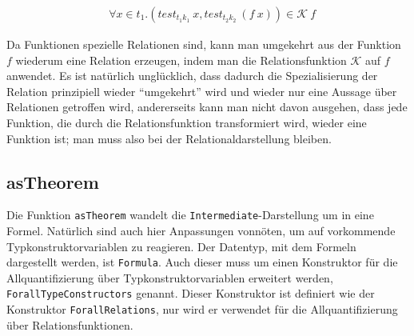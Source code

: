 \begin{align*}
& \forall x \in t_1 . (test_{t_1 k_1}\ x, test_{t_2 k_2}\ (f\ x)) \in \mathcal{K}\ f
\end{align*}

Da Funktionen spezielle Relationen sind, kann man umgekehrt aus der Funktion $f$ wiederum eine Relation erzeugen, indem
man die Relationsfunktion $\mathcal{K}$ auf $f$ anwendet. Es ist natürlich unglücklich, dass dadurch die Spezialisierung
der Relation prinzipiell wieder ``umgekehrt'' wird und wieder nur eine Aussage über Relationen getroffen wird, andererseits
kann man nicht davon ausgehen, dass jede Funktion, die durch die Relationsfunktion transformiert wird, wieder eine Funktion ist;
man muss also bei der Relationaldarstellung bleiben.





\subsection{asTheorem}

Die Funktion \texttt{asTheorem} wandelt die \texttt{Intermediate}-Darstellung um in eine Formel. Natürlich sind auch hier
Anpassungen vonnöten, um auf vorkommende Typkonstruktorvariablen zu reagieren. Der Datentyp, mit dem Formeln
dargestellt werden, ist \texttt{Formula}. Auch dieser muss um einen Konstruktor für die Allquantifizierung über
Typkonstruktorvariablen erweitert werden, \texttt{ForallTypeConstructors} genannt.
Dieser Konstruktor ist definiert wie der Konstruktor \texttt{ForallRelations}, nur wird er verwendet für die Allquantifizierung
über Relationsfunktionen.


